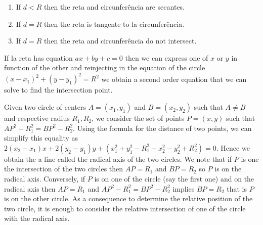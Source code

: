 \begin{enumerate}
\item If $d<R$ then the reta and circunferência are secantes.
\item If $d=R$ then the reta is tangente to la circunferência.
\item If $d=R$ then the reta and circunferência do not intersect.
\end{enumerate}

\begin{center}
\end{center}

If la reta has equation $ax+by+c=0$ then we can express one of $x$ or $y$
in function of the other and reinjecting in the equation of the circle
${(x-x_1)}^2 + {(y-y_1)}^2 = R^2$ we obtain a second order equation that we
can solve to find the intersection point.

Given two circle of centers $A=(x_1,y_1)$ and $B=(x_2,y_2)$ such that
$A\neq B$ and respective
radius $R_1,R_2$, we consider the set of points $P=(x,y)$
such that ${AP}^2 - R_1^2 = {BP}^2 - R_2^2$. Using the formula for the
distance of two points, we can simplify this equality as
${2{(x_2-x_1)}} x + {2{(y_2-y_1)}} y + {(x_1^2+y_1^2-R_1^2-x_2^2-y_2^2+R_2^2)}
= 0$. Hence we obtain the a line called the radical axis of the two circles.
We note that if $P$ is one the intersection of the two circles then
$AP = R_1$ and $BP = R_2$ so $P$ is on the radical axis. Conversely,
if $P$ is on one of the circle (say the first one) and on the radical axis
then $AP = R_1$ and ${AP}^2 - R_1^2 = {BP}^2 - R_2^2$ implies
$BP = R_2$ that is $P$ is on the other circle. As a consequence to determine
the relative position of the two circle, it is enough to consider the
relative intersection of one of the circle with the radical axis.

